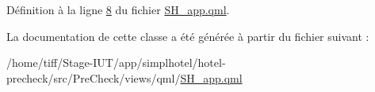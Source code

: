 Définition à la ligne \hyperlink{SH__app_8qml_source_l00008}{8} du fichier \hyperlink{SH__app_8qml_source}{S\-H\-\_\-app.\-qml}.



La documentation de cette classe a été générée à partir du fichier suivant \-:\begin{DoxyCompactItemize}
\item 
/home/tiff/\-Stage-\/\-I\-U\-T/app/simplhotel/hotel-\/precheck/src/\-Pre\-Check/views/qml/\hyperlink{SH__app_8qml}{S\-H\-\_\-app.\-qml}\end{DoxyCompactItemize}
